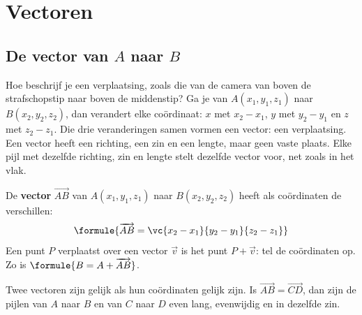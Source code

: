 \begin{oefeningen}
\end{oefeningen}

\section{Vectoren}

\subsection{De vector van \texorpdfstring{$A$}{A} naar \texorpdfstring{$B$}{B}}

Hoe beschrijf je een verplaatsing, zoals die van de camera van boven de strafschopstip naar boven de middenstip? Ga je van $A(x_1, y_1, z_1)$ naar $B(x_2, y_2, z_2)$, dan verandert elke coördinaat: $x$ met $x_2 - x_1$, $y$ met $y_2 - y_1$ en $z$ met $z_2 - z_1$. Die drie veranderingen samen vormen een vector: een verplaatsing. Een vector heeft een richting, een zin en een lengte, maar geen vaste plaats. Elke pijl met dezelfde richting, zin en lengte stelt dezelfde vector voor, net zoals in het vlak.

\begin{theorie}
De \textbf{\textcolor{accent}{vector}} $\overrightarrow{AB}$ van $A(x_1, y_1, z_1)$ naar $B(x_2, y_2, z_2)$ heeft als coördinaten de verschillen:
\[\formule{\overrightarrow{AB} = \vc{x_2 - x_1}{y_2 - y_1}{z_2 - z_1}}\]
Een punt $P$ verplaatst over een vector $\vec v$ is het punt $P + \vec v$: tel de coördinaten op. Zo is $\formule{B = A + \overrightarrow{AB}}$.
\end{theorie}

Twee vectoren zijn gelijk als hun coördinaten gelijk zijn. Is $\overrightarrow{AB} = \overrightarrow{CD}$, dan zijn de pijlen van $A$ naar $B$ en van $C$ naar $D$ even lang, evenwijdig en in dezelfde zin.


